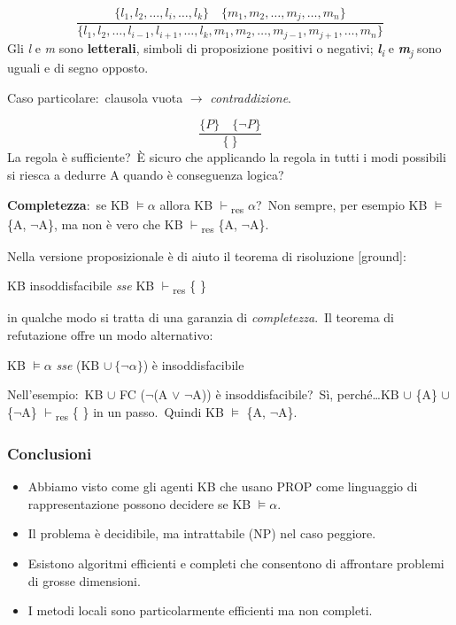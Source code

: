 \[
	\frac{\{l_1,l_2,\dots, l_i, \dots, l_k\} \quad \{m_1, m_2, \dots, m_j, \dots, m_n\}}{\{l_1,l_2,\dots, l_{i-1}, l_{i+1}, \dots, l_k, m_1, m_2, \dots, m_{j-1}, m_{j+1}, \dots, m_n\}}
\]
Gli \textit{l} e \textit{m} sono \textbf{letterali}, simboli di proposizione positivi o negativi; \textit{\textbf{l}\textsubscript{i}} e \textit{\textbf{m}\textsubscript{j}} sono uguali e di segno opposto.\

\vspace{12pt}

\noindent Caso particolare:\ clausola vuota $\rightarrow$ \textit{contraddizione}.

\[
	\frac{\{P\}\quad \{\lnot P\}}{\{\ \}}
\]
\noindent La regola è sufficiente?\ È sicuro che applicando la regola in tutti i modi possibili si riesca a dedurre A quando è conseguenza logica?

\textbf{Completezza}:\ se KB $\models \alpha$ allora KB $\vdash$\textsubscript{res} $\alpha$?\ Non sempre, per esempio KB $\models$ \{A, $\lnot$A\}, ma non è vero che KB $\vdash$\textsubscript{res} \{A, $\lnot$A\}.\

Nella versione proposizionale è di aiuto il teorema di risoluzione [ground]:
\begin{center}
	KB insoddisfacibile \textit{sse} KB $\vdash$\textsubscript{res} \{ \}
\end{center}
in qualche modo si tratta di una garanzia di \textit{completezza}.\
Il teorema di refutazione offre un modo alternativo:\

\begin{center}
	KB $\models \alpha$ \textit{sse} (KB $\cup\ \{\lnot \alpha \}$) è insoddisfacibile
\end{center}

\noindent Nell'esempio:\ KB $\cup$ FC ($\lnot$(A $\lor$ $\lnot$A)) è insoddisfacibile?\ Sì, perché\dots KB $\cup$ \{A\} $\cup$ \{$\lnot$A\} $\vdash$\textsubscript{res} \{ \} in un passo.\ Quindi KB $\models$  \{A, $\lnot$A\}.

\subsubsection{Conclusioni}

\begin{itemize}
	\item Abbiamo visto come gli agenti KB che usano PROP come linguaggio di rappresentazione possono decidere se KB $\models \alpha$.
	\item Il problema è decidibile, ma intrattabile (NP) nel caso peggiore.
	\item Esistono algoritmi efficienti e completi che consentono di affrontare problemi di grosse dimensioni.
	\item I metodi locali sono particolarmente efficienti ma non completi.
\end{itemize}

